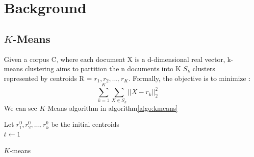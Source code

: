 \section{Background}\label{sec:related}
\subsection{$K$-Means}
Given a corpus C, where each document X is a 
d-dimensional real vector, k-means clustering aims to partition the n 
documents into K $S_k$ clusters represented by centroids 
R = {$r_1, r_2, ..., r_K$}.
Formally, the objective is to minimize :
$$
\sum\limits_{k =1 }^K \sum\limits_{X \in S_k} ||X - r_k||_2^2
$$
We can see $K$-Means algorithm in algorithm\ref{algo:kmeans}
\begin{algorithm}
  Let $r_1^{0}, r_2^{0} , ..., r_k^{0}$ be the initial centroids\\
  $t \gets 1$\\
  \caption{\label{algo:kmeans}$K$-means}
\end{algorithm}


